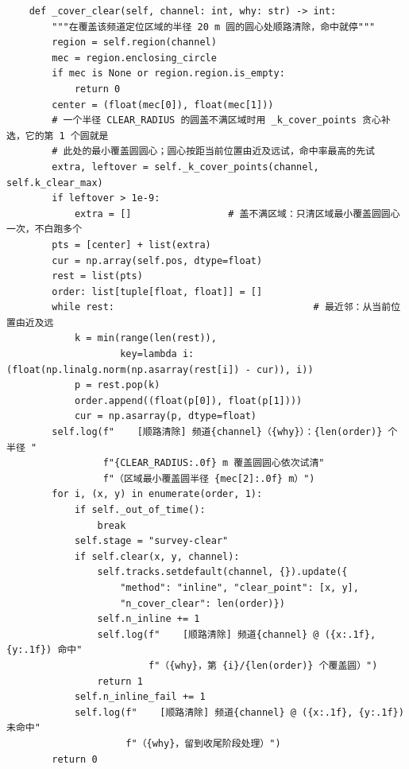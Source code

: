 \documentclass[UTF8, zihao=5,AutoFakeBold=2]{ctexart}
\begin{document}
\begin{lstlisting}
    def _cover_clear(self, channel: int, why: str) -> int:
        """在覆盖该频道定位区域的半径 20 m 圆的圆心处顺路清除，命中就停"""
        region = self.region(channel)
        mec = region.enclosing_circle
        if mec is None or region.region.is_empty:
            return 0
        center = (float(mec[0]), float(mec[1]))
        # 一个半径 CLEAR_RADIUS 的圆盖不满区域时用 _k_cover_points 贪心补选，它的第 1 个圆就是
        # 此处的最小覆盖圆圆心；圆心按距当前位置由近及远试，命中率最高的先试
        extra, leftover = self._k_cover_points(channel, self.k_clear_max)
        if leftover > 1e-9:
            extra = []                 # 盖不满区域：只清区域最小覆盖圆圆心一次，不白跑多个
        pts = [center] + list(extra)
        cur = np.array(self.pos, dtype=float)
        rest = list(pts)
        order: list[tuple[float, float]] = []
        while rest:                                   # 最近邻：从当前位置由近及远
            k = min(range(len(rest)),
                    key=lambda i: (float(np.linalg.norm(np.asarray(rest[i]) - cur)), i))
            p = rest.pop(k)
            order.append((float(p[0]), float(p[1])))
            cur = np.asarray(p, dtype=float)
        self.log(f"    [顺路清除] 频道{channel}（{why}）：{len(order)} 个半径 "
                 f"{CLEAR_RADIUS:.0f} m 覆盖圆圆心依次试清"
                 f"（区域最小覆盖圆半径 {mec[2]:.0f} m）")
        for i, (x, y) in enumerate(order, 1):
            if self._out_of_time():
                break
            self.stage = "survey-clear"
            if self.clear(x, y, channel):
                self.tracks.setdefault(channel, {}).update({
                    "method": "inline", "clear_point": [x, y],
                    "n_cover_clear": len(order)})
                self.n_inline += 1
                self.log(f"    [顺路清除] 频道{channel} @ ({x:.1f}, {y:.1f}) 命中"
                         f"（{why}，第 {i}/{len(order)} 个覆盖圆）")
                return 1
            self.n_inline_fail += 1
            self.log(f"    [顺路清除] 频道{channel} @ ({x:.1f}, {y:.1f}) 未命中"
                     f"（{why}，留到收尾阶段处理）")
        return 0


\end{lstlisting}
\end{document}

